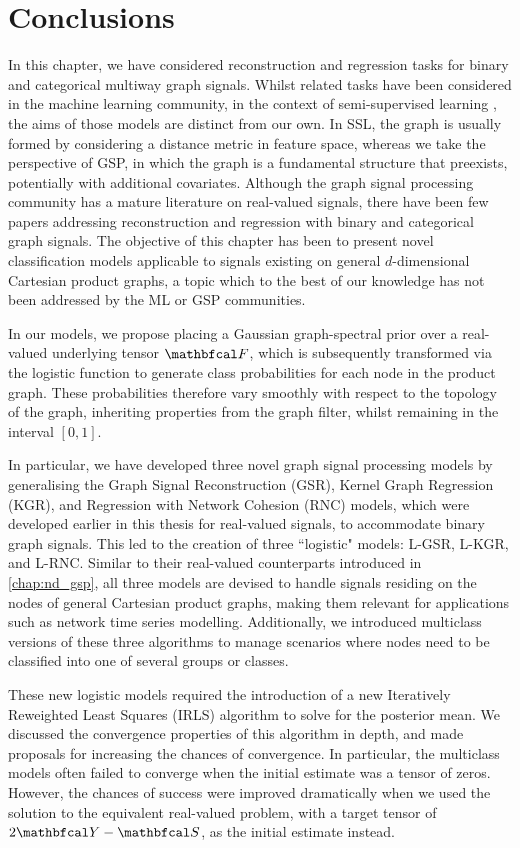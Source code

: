 \section{Conclusions}

In this chapter, we have considered reconstruction and regression tasks for binary and categorical multiway graph signals. Whilst related tasks have been considered in the machine learning community, in the context of semi-supervised learning \cite{Kondor2002,Zhu2003}, the aims of those models are distinct from our own. In SSL, the graph is usually formed by considering a distance metric in feature space, whereas we take the perspective of GSP, in which the graph is a fundamental structure that preexists, potentially with additional covariates. Although the graph signal processing community has a mature literature on real-valued signals, there have been few papers addressing reconstruction and regression with binary and categorical graph signals. The objective of this chapter has been to present novel classification models applicable to signals existing on general $d$-dimensional Cartesian product graphs, a topic which to the best of our knowledge has not been addressed by the ML or GSP communities. 

In our models, we propose placing a Gaussian graph-spectral prior over a real-valued underlying tensor $\Ft$, which is subsequently transformed via the logistic function to generate class probabilities for each node in the product graph. These probabilities therefore vary smoothly with respect to the topology of the graph, inheriting properties from the graph filter, whilst remaining in the interval $[0, 1]$. 

In particular, we have developed three novel graph signal processing models by generalising the Graph Signal Reconstruction (GSR), Kernel Graph Regression (KGR), and Regression with Network Cohesion (RNC) models, which were developed earlier in this thesis for real-valued signals, to accommodate binary graph signals. This led to the creation of three ``logistic" models: L-GSR, L-KGR, and L-RNC. Similar to their real-valued counterparts introduced in \cref{chap:nd_gsp}, all three models are devised to handle signals residing on the nodes of general Cartesian product graphs, making them relevant for applications such as network time series modelling. Additionally, we introduced multiclass versions of these three algorithms to manage scenarios where nodes need to be classified into one of several groups or classes. 

These new logistic models required the introduction of a new Iteratively Reweighted Least Squares (IRLS) algorithm to solve for the posterior mean. We discussed the convergence properties of this algorithm in depth, and made proposals for increasing the chances of convergence. In particular, the multiclass models often failed to converge when the initial estimate was a tensor of zeros. However, the chances of success were improved dramatically when we used the solution to the equivalent real-valued problem, with a target tensor of $2\Yt - \St$, as the initial estimate instead. 

